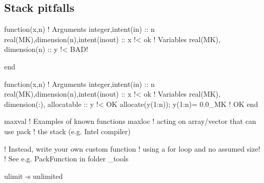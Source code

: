 \documentclass{article}
\begin{document}
\subsection{Stack pitfalls}
\begin{codea}
function(x,n)
! Arguments
integer,intent(in) :: n
real(MK),dimension(n),intent(inout) :: x !< ok
! Variables
real(MK), dimension(n) :: y !< BAD!

end
\end{codea} 
\begin{codeb}
function(x,n)
! Arguments
integer,intent(in) :: n
real(MK),dimension(n),intent(inout) :: x !< ok
! Variables
real(MK), dimension(:), allocatable :: y !< OK
allocate(y(1:n)); y(1:n)= 0.0_MK         !  OK
end
\end{codeb}
\begin{codea}
maxval  ! Examples of known functions 
maxloc  ! acting on array/vector that can use
pack    ! the stack (e.g. Intel compiler)
\end{codea} 
\begin{codeb}
! Instead, write your own custom function
! using a for loop and no assumed size!
! See e.g. PackFunction in folder _tools
\end{codeb}
\begin{codea}
\end{codea} 
\begin{codeb}
ulimit -s unlimited
\end{codeb}


\end{document}
